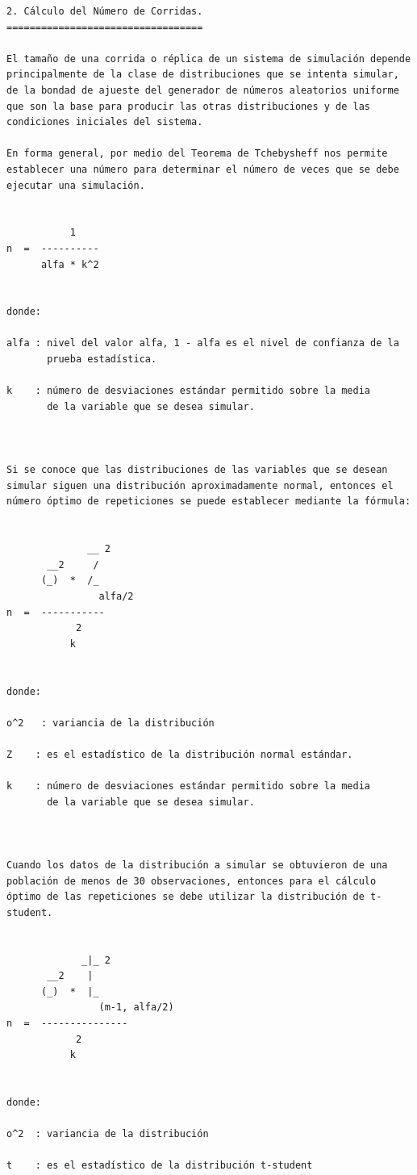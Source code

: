 \begin{verbatim}
2. Cálculo del Número de Corridas.
==================================

El tamaño de una corrida o réplica de un sistema de simulación depende principalmente de la clase de distribuciones que se intenta simular, de la bondad de ajueste del generador de números aleatorios uniforme que son la base para producir las otras distribuciones y de las condiciones iniciales del sistema.

En forma general, por medio del Teorema de Tchebysheff nos permite establecer una número para determinar el número de veces que se debe ejecutar una simulación.


           1 
n  =  ----------
      alfa * k^2


donde:

alfa : nivel del valor alfa, 1 - alfa es el nivel de confianza de la
       prueba estadística.

k    : número de desviaciones estándar permitido sobre la media
       de la variable que se desea simular.



Si se conoce que las distribuciones de las variables que se desean simular siguen una distribución aproximadamente normal, entonces el número óptimo de repeticiones se puede establecer mediante la fórmula:


              __ 2
       __2     /
      (_)  *  /_
                alfa/2
n  =  -----------
            2
           k


donde:

o^2   : variancia de la distribución

Z    : es el estadístico de la distribución normal estándar.

k    : número de desviaciones estándar permitido sobre la media
       de la variable que se desea simular.



Cuando los datos de la distribución a simular se obtuvieron de una población de menos de 30 observaciones, entonces para el cálculo óptimo de las repeticiones se debe utilizar la distribución de t-student.


             _|_ 2
       __2    |
      (_)  *  |_
                (m-1, alfa/2)
n  =  ---------------
            2
           k


donde:

o^2  : variancia de la distribución

t    : es el estadístico de la distribución t-student


\end{verbatim}
